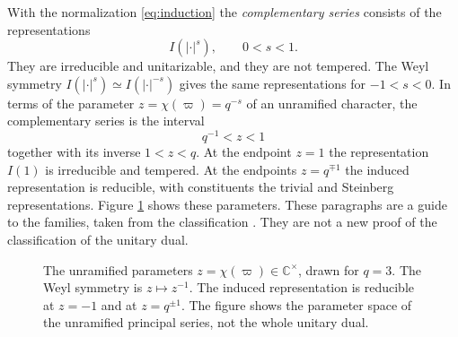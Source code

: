 \documentclass[12pt,letterpaper]{amsart}
\numberwithin{equation}{section}
\theoremstyle{definition}
\theoremstyle{remark}
\newcommand{\St}{\operatorname{St}}
\newcommand{\triv}{\mathbf 1}
\begin{document}
With the normalization \eqref{eq:induction} the \emph{complementary series} consists of the representations
\begin{equation}\label{eq:complementary}
I(|\cdot|^s),\qquad 0<s<1 .
\end{equation}
They are irreducible and unitarizable, and they are not tempered. The Weyl symmetry $I(|\cdot|^s)\simeq I(|\cdot|^{-s})$ gives the same representations for $-1<s<0$. In terms of the parameter $z=\chi(\varpi)=q^{-s}$ of an unramified character, the complementary series is the interval
\[
q^{-1}<z<1
\]
together with its inverse $1<z<q$. At the endpoint $z=1$ the representation $I(1)$ is irreducible and tempered. At the endpoints $z=q^{\mp1}$ the induced representation is reducible, with constituents the trivial and Steinberg representations. Figure \ref{fig:parameters} shows these parameters. These paragraphs are a guide to the families, taken from the classification \cite{GG63,Ta92}. They are not a new proof of the classification of the unitary dual.
\begin{figure}[htbp]\centering
{}
\caption{The unramified parameters $z=\chi(\varpi)\in\mathbb C^\times$, drawn for $q=3$. The Weyl symmetry is $z\mapsto z^{-1}$. The induced representation is reducible at $z=-1$ and at $z=q^{\pm1}$. The figure shows the parameter space of the unramified principal series, not the whole unitary dual.}\label{fig:parameters}
\end{figure}
\end{document}
